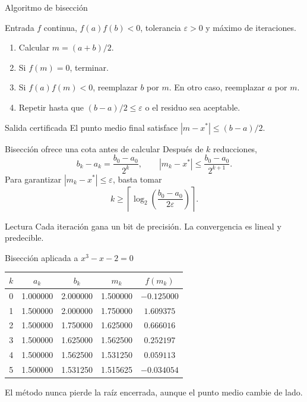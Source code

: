 \documentclass[aspectratio=169,12pt]{beamer}
\newcommand{\absval}[1]{\left|#1\right|}
\begin{document}
\begin{frame}{Algoritmo de bisección}
\begin{block}{Entrada}
$f$ continua, $f(a)f(b)<0$, tolerancia $\varepsilon>0$ y máximo de iteraciones.
\end{block}
\begin{enumerate}
  \item Calcular $m=(a+b)/2$.
  \item Si $f(m)=0$, terminar.
  \item Si $f(a)f(m)<0$, reemplazar $b$ por $m$. En otro caso, reemplazar $a$ por $m$.
  \item Repetir hasta que $(b-a)/2\leq\varepsilon$ o el residuo sea aceptable.
\end{enumerate}
\begin{block}{Salida certificada}
El punto medio final satisface $\absval{m-x^*}\leq(b-a)/2$.
\end{block}
\end{frame}

\begin{frame}{Bisección ofrece una cota antes de calcular}
Después de $k$ reducciones,
\[
b_k-a_k=\frac{b_0-a_0}{2^k},
\qquad
\absval{m_k-x^*}\leq\frac{b_0-a_0}{2^{k+1}}.
\]
Para garantizar $\absval{m_k-x^*}\leq\varepsilon$, basta tomar
\[
k\geq
\left\lceil
\log_2\!\left(\frac{b_0-a_0}{2\varepsilon}\right)
\right\rceil.
\]
\begin{block}{Lectura}
Cada iteración gana un bit de precisión. La convergencia es lineal y predecible.
\end{block}
\end{frame}

\begin{frame}{Bisección aplicada a $x^3-x-2=0$}
\centering
\begin{tabular}{ccccc}
\toprule
$k$ & $a_k$ & $b_k$ & $m_k$ & $f(m_k)$ \\
\midrule
0 & 1.000000 & 2.000000 & 1.500000 & $-0.125000$ \\
1 & 1.500000 & 2.000000 & 1.750000 & $ 1.609375$ \\
2 & 1.500000 & 1.750000 & 1.625000 & $ 0.666016$ \\
3 & 1.500000 & 1.625000 & 1.562500 & $ 0.252197$ \\
4 & 1.500000 & 1.562500 & 1.531250 & $ 0.059113$ \\
5 & 1.500000 & 1.531250 & 1.515625 & $-0.034054$ \\
\bottomrule
\end{tabular}
\vspace{0.35cm}

El método nunca pierde la raíz encerrada, aunque el punto medio cambie de lado.
\end{frame}
\end{document}
